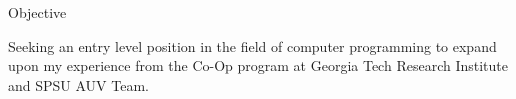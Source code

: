 
\begin{rSection}{Objective}

Seeking an entry level position in the field of computer programming to expand upon my experience from the Co-Op program at Georgia Tech Research Institute and SPSU AUV Team.

\end{rSection}
